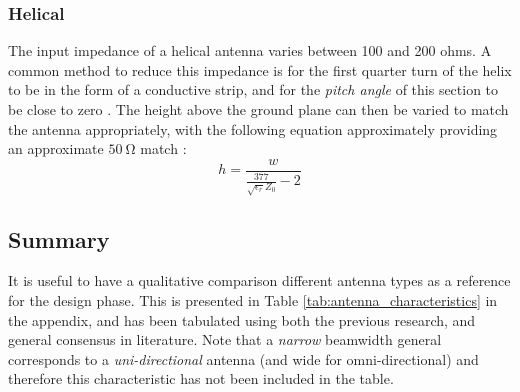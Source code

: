 \subsubsection{Helical}\label{sec:helical_matching}
The input impedance of a helical antenna varies between 100 and 200 ohms. A common method to reduce this impedance is for the first quarter turn of the helix to be in the form of a conductive strip, and for the \textit{pitch angle} of this section to be close to zero \cite{textbook-antennaTheoryAnalysisDesign}. The height above the ground plane can then be varied to match the antenna appropriately, with the following equation approximately providing an approximate $\SI{50}{\ohm}$ match \cite{textbook-antennaTheoryAnalysisDesign}:
$$h = \frac{w}{\frac{377}{\sqrt{\epsilon_r} Z_0} - 2}$$

\subsection{Summary}
It is useful to have a qualitative comparison different antenna types as a reference for the design phase. This is presented in Table \ref{tab:antenna_characteristics} in the appendix, and has been tabulated using both the previous research, and general consensus in literature. Note that a \textit{narrow} beamwidth general corresponds to a \textit{uni-directional} antenna (and wide for omni-directional) and therefore this characteristic has not been included in the table.